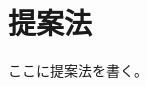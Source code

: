 \documentclass[12pt,a4paper,oneside,onecolumn,fleqn,dvipdfmx]{jreport}
\begin{document}
    \chapter{提案法}
        ここに提案法を書く。
\end{document}
